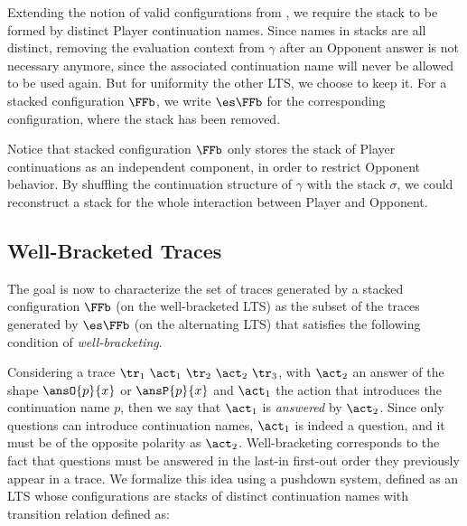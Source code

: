 Extending the notion of valid configurations from \AOGS,
we require the stack to be formed by distinct Player continuation names.
Since names in stacks are all distinct, removing the evaluation context 
from $\gamma$ after an Opponent answer is not necessary anymore, since the 
associated continuation name will never be allowed to be used again. 
But for uniformity \wrt the other LTS, we choose to keep it.
For a stacked configuration $\FFb$, we write $\es \FFb$ for the corresponding \AOGS
configuration, where the stack has been removed.

Notice that stacked configuration $\FFb$
only stores the stack of Player continuations as an independent component,
in order to restrict Opponent behavior.
By shuffling the continuation structure of $\gamma$ with
the stack $\sigma$, we could reconstruct
a stack for the whole interaction between Player and Opponent.

\subsection{Well-Bracketed Traces}

The goal is now to characterize the set of traces generated by a stacked configuration
$\FFb$ (on the well-bracketed LTS) as the subset of the traces generated by $\es \FFb$ 
(on the alternating LTS) that satisfies the following condition of \emph{well-bracketing}.

Considering a trace $\tr_1 \ \act_1  \ \tr_2 \ \act_2 \ \tr_3$,
with $\act_2$ an answer of the shape $\ansO{p}{x}$ or $\ansP{p}{x}$
and $\act_1$ the action that introduces the continuation name $p$,
then we say that $\act_1$ is \emph{answered} by $\act_2$.
Since only questions can introduce continuation names, 
$\act_1$ is indeed a question, and it must be of the opposite polarity
as $\act_2$.
%
Well-bracketing corresponds to the fact that questions must be answered in the last-in
first-out order they previously appear in a trace.
We formalize this idea using a pushdown system, defined as an LTS whose configurations are 
stacks of distinct continuation names with transition relation defined as:

